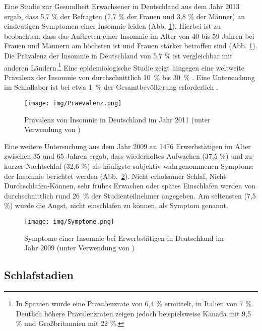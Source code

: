 Eine Studie zur Gesundheit Erwachsener in Deutschland aus dem Jahr 2013 ergab, dass 5,7 \% der Befragten (7,7 \% der Frauen und 3,8 \% der Männer) an eindeutigen Symptomen einer Insomnie leiden (Abb. \ref{fig:praevalenz}). Hierbei ist zu beobachten, dass das Auftreten einer Insomnie im Alter von 40 bis 59 Jahren bei Frauen und Männern am höchsten ist und Frauen stärker betroffen sind (Abb. \ref{fig:praevalenz}). Die Prävalenz der Insomnie in Deutschland von 5,7 \% ist vergleichbar mit anderen Ländern.\footnote{In Spanien wurde eine Prävalenzrate von 6,4 \% ermittelt, in Italien von 7 \%. Deutlich höhere Prävalenzraten zeigen jedoch beispielsweise Kanada mit 9,5 \% und Großbritannien mit 22 \%.} Eine epidemiologische Studie zeigt hingegen eine weltweite Prävalenz der Insomnie von durchschnittlich 10~\% bis 30~\% \parencite{ohayon_epidemiological_2011}. Eine Untersuchung im Schlaflabor ist bei etwa 1~\% der Gesamtbevölkerung erforderlich \parencite{penzel_schlafstorungen_2005}.
\parencite{schlack_haufigkeit_2013, robert_koch_institut_gesundheit_2015}

\begin{figure}[H]
	\centering
	\texttt{[image: img/Praevalenz.png]}
	\caption[Prävalenz von Insomnie]{Prävalenz von Insomnie in Deutschland im Jahr 2011 (unter Verwendung von \parencite{schlack_haufigkeit_2013})}
	\label{fig:praevalenz}
\end{figure}

Eine weitere Untersuchung aus dem Jahr 2009 an 1476 Erwerbstätigen im Alter zwischen 35 und 65 Jahren ergab, dass wiederholtes Aufwachen (37,5 \%) und zu kurzer Nachtschlaf (32,6 \%) als häufigste subjektiv wahrgenommenen Symptome der Insomnie berichtet werden (Abb.~\ref{fig:symptome}). Nicht erholsamer Schlaf, Nicht-Durchschlafen-Können, sehr frühes Erwachen oder spätes Einschlafen werden von durchschnittlich rund 26~\% der Studienteilnehmer angegeben. Am seltensten (7,5 \%) wurde die Angst, nicht einschlafen zu können, als Symptom genannt. \parencite{dak_forschung_gesundheitsreport_2010}

\begin{figure}[H]
	\centering
	\texttt{[image: img/Symptome.png]}
	\caption[Symptome der Insomnie]{Symptome einer Insomnie bei Erwerbstätigen in Deutschland im Jahr 2009 (unter Verwendung von \parencite{dak_forschung_gesundheitsreport_2010})}
	\label{fig:symptome}
\end{figure}

\subsection{Schlafstadien}\label{schlafstadien} 

